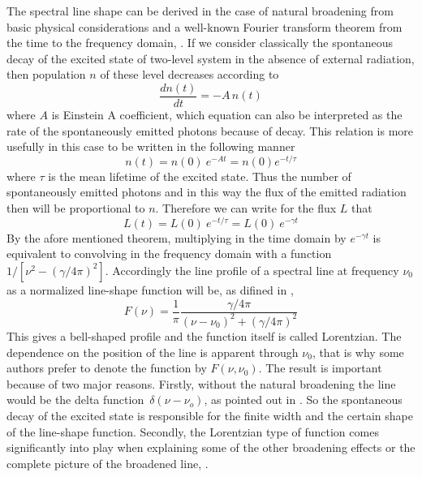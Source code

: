 The spectral line shape can be derived in the case of natural
broadening from basic physical considerations and a well-known Fourier
transform theorem from the time to the frequency domain, \citet{thorne:99}. If we
consider classically the spontaneous decay of the excited state of
two-level system in the absence of external radiation, then population
$n$ of these level decreases according to
\begin{equation}\label{spon_decay_diff}
  \frac{dn(t)}{dt} = -A\,n(t)
\end{equation}
where $A$ is Einstein A coefficient, which equation can also be
interpreted as the rate of the spontaneously emitted photons because
of decay. This relation is more usefully in this case to be written in
the following manner 
\begin{equation}\label{spon_decay_exp}
  n(t)=n(0)~e^{-At}=n(0)e^{-t/\tau}
\end{equation}
where $ \tau$ is the mean lifetime of the excited state. Thus the
number of spontaneously emitted photons and in this way the flux of
the emitted radiation then will be proportional to $n$. Therefore we
can write for the flux $L$ that
\begin{equation}\label{flux}
  L(t)=L(0)~e^{-t/ \tau}=L(0)~e^{-\gamma t}
\end{equation}
By the afore mentioned theorem, multiplying in the time domain by
$e^{-\gamma t}$ is equivalent to convolving in the frequency domain
with a function $1/[\nu^2 - (\gamma/4\pi)^2]$. Accordingly the line
profile of a spectral line at frequency $ \nu_0$ as a normalized
line-shape function will be, as difined in \citet{thorne:99},
\begin{equation}\label{natural_lorentz}
  F(\nu)=\frac{1}{\pi}\frac{\gamma/4\pi}{(\nu - \nu_0)^2 + (\gamma/4\pi)^2}
\end{equation}
This gives a bell-shaped profile and the function itself is called
Lorentzian. The dependence on the position of the line is apparent
through $\nu_0$, that is why some authors prefer to denote the
function by $F(\nu,\nu_0)$.  The result is important because of two
major reasons.  Firstly, without the natural broadening the line would
be the delta function~$\delta (\nu - \nu_o)$, as pointed out in
\citet{bernath:95}. So the spontaneous decay of the excited state is
responsible for the finite width and the certain shape of the
line-shape function. Secondly, the Lorentzian type of function comes
significantly into play when explaining some of the other broadening
effects or the complete picture of the broadened line, \citet{thorne:99}.

